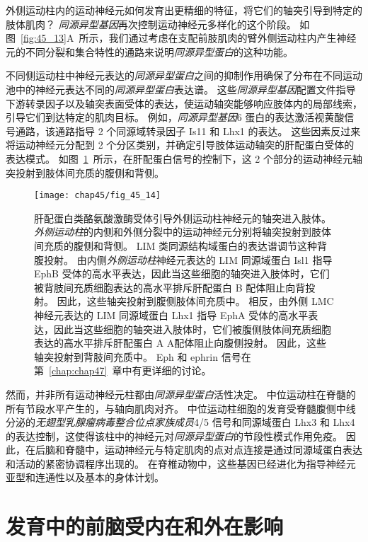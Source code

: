 外侧运动柱内的运动神经元如何发育出更精细的特征，将它们的轴突引导到特定的肢体肌肉？
\textit{同源异型基因}再次控制运动神经元多样化的这个阶段。
如图~\ref{fig:45_13}A~所示，我们通过考虑在支配前肢肌肉的臂外侧运动柱内产生神经元的不同分裂和集合特性的通路来说明\textit{同源异型蛋白}的这种功能。


不同侧运动柱中神经元表达的\textit{同源异型蛋白}之间的抑制作用确保了分布在不同运动池中的神经元表达不同的\textit{同源异型蛋白}表达谱。
这些\textit{同源异型基因}配置文件指导下游转录因子以及轴突表面受体的表达，使运动轴突能够响应肢体内的局部线索，引导它们到达特定的肌肉目标。
例如，\textit{同源异型基因}6 蛋白的表达激活视黄酸信号通路，该通路指导 2 个同源域转录因子 Is11 和 Lhx1 的表达。
这些因素反过来将运动神经元分配到 2 个分区类别，并确定引导肢体运动轴突的肝配蛋白受体的表达模式。
如图~\ref{fig:45_14}~所示，在肝配蛋白信号的控制下，这 2 个部分的运动神经元轴突投射到肢体间充质的腹侧和背侧。


\begin{figure}[htbp]
	\centering
	\texttt{[image: chap45/fig\_45\_14]}
	\caption{肝配蛋白类酪氨酸激酶受体引导外侧运动柱神经元的轴突进入肢体。
		\textit{外侧运动柱}的内侧和外侧分裂中的运动神经元分别将轴突投射到肢体间充质的腹侧和背侧。
		LIM 类同源结构域蛋白的表达谱调节这种背腹投射。 
		由内侧\textit{外侧运动柱}神经元表达的 LIM 同源域蛋白 Isl1 指导 EphB 受体的高水平表达，因此当这些细胞的轴突进入肢体时，它们被背肢间充质细胞表达的高水平排斥肝配蛋白 B 配体阻止向背投射。
		因此，这些轴突投射到腹侧肢体间充质中。
		相反，由外侧 LMC 神经元表达的 LIM 同源域蛋白 Lhx1 指导 EphA 受体的高水平表达，因此当这些细胞的轴突进入肢体时，它们被腹侧肢体间充质细胞表达的高水平排斥肝配蛋白 A A配体阻止向腹侧投射。
		因此，这些轴突投射到背肢间充质中。
		Eph 和 ephrin 信号在第~\ref{chap:chap47}~章中有更详细的讨论。}
	\label{fig:45_14}
\end{figure}


然而，并非所有运动神经元柱都由\textit{同源异型蛋白}活性决定。
中位运动柱在脊髓的所有节段水平产生的，与轴向肌肉对齐。
中位运动柱细胞的发育受脊髓腹侧中线分泌的\textit{无翅型乳腺瘤病毒整合位点家族成员}4/5 信号和同源域蛋白 Lhx3 和 Lhx4 的表达控制，这使得该柱中的神经元对\textit{同源异型蛋白}的节段性模式作用免疫。
因此，在后脑和脊髓中，运动神经元与特定肌肉的点对点连接是通过同源域蛋白表达和活动的紧密协调程序出现的。
在脊椎动物中，这些基因已经进化为指导神经元亚型和连通性以及基本的身体计划。



\section{发育中的前脑受内在和外在影响}


